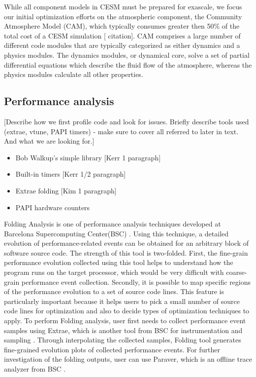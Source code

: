 While all component models in CESM must be prepared for exascale, we focus our initial 
optimization efforts on the atmospheric component, the Community Atmosphere Model (CAM), which typically consumes greater then 50\% of the total cost of a CESM simulation [{\color{red} citation}].  CAM comprises a large number of different code modules that are typically  categorized as either dynamics and a physics modules.  The dynamics modules, or dynamical core, solve a set of partial differential equations which describe the fluid flow of the atmosphere, whereas the physics modules calculate all other properties.  




\subsection{Performance analysis}\label{sec:perf}

[{\color{red}Describe how we first profile code and look for issues.  Briefly describe tools used (extrae, vtune, PAPI timers) - make sure to cover all referred to later in text.  And what we are looking for.}]

{\color{red}
 \begin{itemize}
   \item {Bob Walkup's simple library} [Kerr 1 paragraph]
   \item {Built-in timers} [Kerr 1/2 paragraph]
   \item {Extrae folding} [Kim 1 paragraph]
 \item PAPI hardware counters \cite{papi}
 \end{itemize}
}

Folding Analysis is one of performance analysis techniques developed at Barcelona Supercomputing Center(BSC) \cite{folding}. Using this technique, a detailed evolution of performance-related events can be obtained for an arbitrary block of software source code. The strength of this tool is two-folded. First, the fine-grain performance evolution collected using this tool helps to understand how the program runs on the target processor, which would be very difficult with coarse-grain performance event collection. Secondly, it is possible to map specific regions of the performance evolution to a set of source code lines. This feature is particularly important because it helps users to pick a small number of source code lines for optimization and also to decide types of optimization techniques to apply. To perform Folding analysis, user first needs to collect performance event samples using Extrae, which is another tool from BSC for instrumentation and sampling \cite{extrae}. Through interpolating the collected samples, Folding tool generates fine-grained evolution plots of collected performance events. For further investigation of the folding outputs, user can use Paraver, which is an offline trace analyzer from BSC \cite{paraver}.

